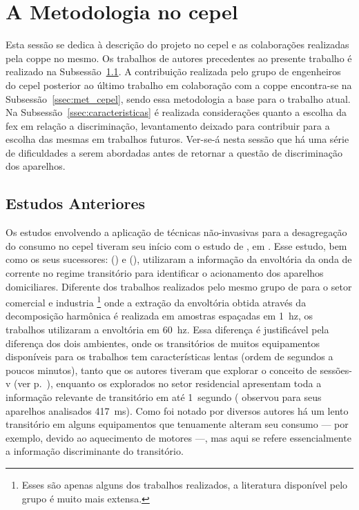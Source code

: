\section[A Metodologia no CEPEL]{A Metodologia no \acs{cepel}}
\label{sec:nilm_cepel}

Esta sessão se dedica à descrição do projeto no \gls{cepel} e as
colaborações realizadas pela \acs{coppe} no mesmo. Os trabalhos de
autores precedentes ao presente trabalho é realizado na
Subsessão~\ref{ssec:cepel_anteriores}. A contribuição realizada pelo
grupo de engenheiros do \gls{cepel} posterior ao último trabalho em
colaboração com a \acs{coppe} encontra-se na
Subsessão~\ref{ssec:met_cepel}, sendo essa metodologia a base
para o trabalho atual. Na Subsessão~\ref{ssec:caracteristicas} é
realizada considerações quanto a escolha da \gls{fex} em relação a
discriminação, levantamento deixado para contribuir para a escolha das
mesmas em trabalhos futuros. Ver-se-á nesta sessão que há uma série de
dificuldades a serem abordadas antes de retornar a questão de
discriminação dos aparelhos.

\subsection{Estudos Anteriores}
\label{ssec:cepel_anteriores}

Os estudos envolvendo a aplicação de técnicas não-invasivas para a
desagregação do consumo no \gls{cepel} tiveram seu início com o estudo de
\citet*{nilm_cepel_aguiar}, em \citeyear{nilm_cepel_aguiar}. Esse
estudo, bem como os seus sucessores:
\citet*{nilm_cepel_bezerra} (\citeyear{nilm_cepel_bezerra}) e 
\citet*{nilm_cepel_alvaro} (\citeyear{nilm_cepel_alvaro}), utilizaram a
informação da envoltória da onda de corrente no regime transitório
para identificar o acionamento dos aparelhos domiciliares. Diferente
dos trabalhos realizados pelo mesmo grupo de
\citeauthor*{nilm_hart_1992_8} para o setor comercial e industria
\cite{nilm_norford_leeb_medianfilt_1996_13,
nilm_leeb_spectral_envelope_1995_23}\footnote{Esses são apenas alguns
dos trabalhos realizados, a literatura disponível pelo grupo é muito
mais extensa.} onde a extração da envoltória obtida através da decomposição
harmônica é realizada em amostras espaçadas em 1~\acs{hz}, os
trabalhos utilizaram a envoltória em 60~\acs{hz}. Essa diferença
é justificável pela diferença dos dois ambientes, onde os transitórios
de muitos equipamentos disponíveis para os trabalhos
\cite{nilm_norford_leeb_medianfilt_1996_13,
nilm_leeb_spectral_envelope_1995_23} tem características lentas (ordem
de segundos a poucos minutos), tanto que os autores tiveram que
explorar o conceito de sessões-v (ver
p.~\pageref{nilm:pot_real_trans}), enquanto os explorados no setor
residencial apresentam toda a informação relevante de
transitório em até 1~segundo (\cite{nilm_cepel_aguiar} observou para
seus aparelhos analisados 417~ms). Como foi notado por diversos autores
\cite{nilm_hart_1992_8,nilm_sultanem_1991_10,
nilm_cole_data_extraction_1998_14,nilm_cole_extra_info_surge_1998_15}
há um lento transitório em alguns equipamentos que tenuamente alteram
seu consumo --- por exemplo, devido ao aquecimento de motores ---, mas
aqui se refere essencialmente a informação discriminante do
transitório.

